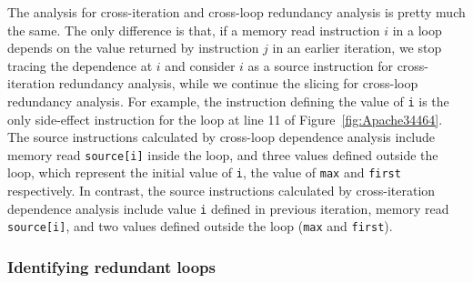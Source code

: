 

The analysis for cross-iteration and cross-loop redundancy analysis is pretty
much the same. The only difference is that, if a memory read instruction 
$i$ in a loop depends on the value returned by instruction $j$ in an earlier
iteration, we stop tracing the dependence at $i$ and consider $i$ as a
source instruction for cross-iteration redundancy analysis, while we continue
the slicing for cross-loop redundancy analysis. 
For example, 
the instruction defining the value of \texttt{i} is the only side-effect instruction 
for the loop at line 11 of Figure~\ref{fig:Apache34464}. 
The source instructions calculated by cross-loop dependence analysis include 
memory read \texttt{source[i]} inside the loop, 
and three values defined outside the loop, 
which represent the initial value of \texttt{i}, the value of \texttt{max} and \texttt{first} respectively. 
In contrast, 
the source instructions calculated by cross-iteration dependence analysis 
include value \texttt{i} defined in previous iteration, 
memory read \texttt{source[i]}, 
and two values defined outside the loop (\texttt{max} and \texttt{first}).  


\subsubsection{Identifying redundant loops}
\label{sec:6_cal}

